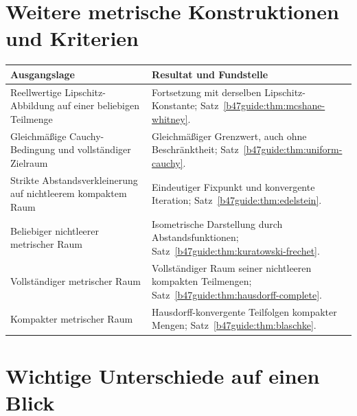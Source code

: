 \section{Weitere metrische Konstruktionen und Kriterien}

\begin{center}
\small
\begin{tabularx}{\linewidth}{@{}>{\raggedright\arraybackslash}p{.36\linewidth}>{\raggedright\arraybackslash}X@{}}
\toprule
Ausgangslage & Resultat und Fundstelle\\
\midrule
Reellwertige Lipschitz-Abbildung auf einer beliebigen Teilmenge &
Fortsetzung mit derselben Lipschitz-Konstante;
Satz~\ref{b47guide:thm:mcshane-whitney}.\\[4pt]
Gleichmäßige Cauchy-Bedingung und vollständiger Zielraum &
Gleichmäßiger Grenzwert, auch ohne Beschränktheit;
Satz~\ref{b47guide:thm:uniform-cauchy}.\\[4pt]
Strikte Abstandsverkleinerung auf nichtleerem kompaktem Raum &
Eindeutiger Fixpunkt und konvergente Iteration;
Satz~\ref{b47guide:thm:edelstein}.\\[4pt]
Beliebiger nichtleerer metrischer Raum &
Isometrische Darstellung durch Abstandsfunktionen;
Satz~\ref{b47guide:thm:kuratowski-frechet}.\\[4pt]
Vollständiger metrischer Raum &
Vollständiger Raum seiner nichtleeren kompakten Teilmengen;
Satz~\ref{b47guide:thm:hausdorff-complete}.\\[4pt]
Kompakter metrischer Raum &
Hausdorff-konvergente Teilfolgen kompakter Mengen;
Satz~\ref{b47guide:thm:blaschke}.\\
\bottomrule
\end{tabularx}
\end{center}
\section{Wichtige Unterschiede auf einen Blick}


